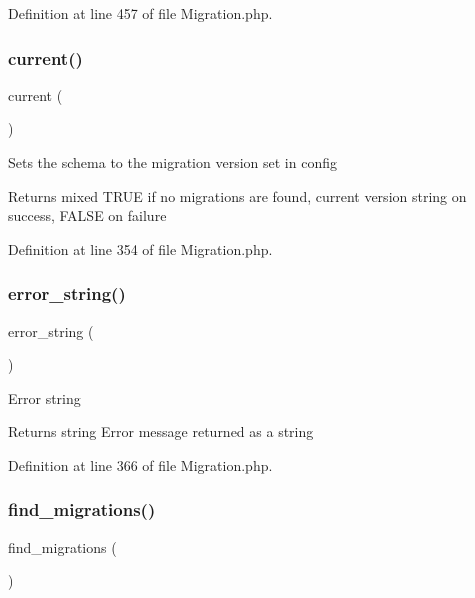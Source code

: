 Definition at line 457 of file Migration.\+php.

\mbox{\label{class_c_i___migration_af343507d1926e6ecf964625d41db528c}} 
\subsubsection{\texorpdfstring{current()}{current()}}
{\footnotesize\ttfamily current (\begin{DoxyParamCaption}{ }\end{DoxyParamCaption})}

Sets the schema to the migration version set in config

\begin{DoxyReturn}{Returns}
mixed T\+R\+UE if no migrations are found, current version string on success, F\+A\+L\+SE on failure 
\end{DoxyReturn}


Definition at line 354 of file Migration.\+php.

\mbox{\label{class_c_i___migration_aad434fa9bec99e30d6a86beb5c2607df}} 
\subsubsection{\texorpdfstring{error\_string()}{error\_string()}}
{\footnotesize\ttfamily error\+\_\+string (\begin{DoxyParamCaption}{ }\end{DoxyParamCaption})}

Error string

\begin{DoxyReturn}{Returns}
string Error message returned as a string 
\end{DoxyReturn}


Definition at line 366 of file Migration.\+php.

\mbox{\label{class_c_i___migration_a6581e916a05e39e46c09fe9878b2d93a}} 
\subsubsection{\texorpdfstring{find\_migrations()}{find\_migrations()}}
{\footnotesize\ttfamily find\+\_\+migrations (\begin{DoxyParamCaption}{ }\end{DoxyParamCaption})}

